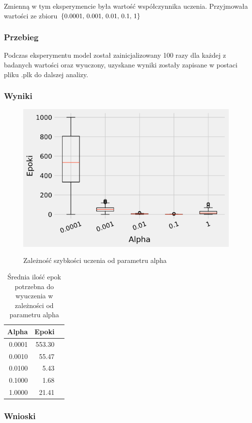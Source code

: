 \documentclass{article}
\begin{document}
Zmienną w tym eksperymencie była wartość współczynnika uczenia. Przyjmowała wartości ze zbioru \(\{$0.0001, 0.001, 0.01, 0.1, 1$\}\)

\subsubsection*{Przebieg}

Podczas eksperymentu model został zainicjalizowany 100 razy dla każdej z badanych wartości oraz wyuczony, uzyskane wyniki zostały zapisane w postaci pliku .plk do dalszej analizy.

\subsubsection*{Wyniki}

\begin{figure}[h]
	\centering
	\caption{Zależność szybkości uczenia od parametru alpha}
	\includegraphics[width=.5\textwidth]{ada_alpha.png}
	\label{fig:res6}
\end{figure}

\begin{table}[h]
	\caption{Średnia ilość epok potrzebna do wyuczenia w zależności od parametru alpha}
	\label{tabela-res-6}
	\centering
	\begin{tabular}{rrr}
		\toprule
		Alpha  & Epoki  \\
		\midrule
		0.0001 & 553.30 \\
		0.0010 & 55.47  \\
		0.0100 & 5.43   \\
		0.1000 & 1.68   \\
		1.0000 & 21.41  \\
		\bottomrule
	\end{tabular}
\end{table}

\subsubsection*{Wnioski}
\end{document}

